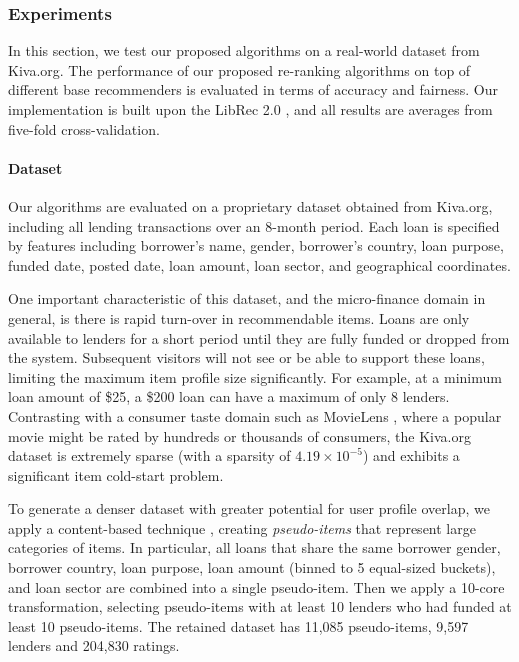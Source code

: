 \subsubsection{\textbf{Experiments}}\label{sect:exp}
\hfill

In this section, we test our proposed algorithms on a real-world dataset from Kiva.org. The performance of our proposed re-ranking algorithms on top of different base recommenders is evaluated in terms of accuracy and fairness. Our implementation is built upon the LibRec 2.0 \cite{guo2015librec}, and all results are averages from five-fold cross-validation.


\paragraph{\textbf{Dataset}}
Our algorithms are evaluated on a proprietary dataset obtained from Kiva.org, including all lending transactions over an 8-month period. Each loan is specified by features including borrower's name, gender, borrower's country, loan purpose, funded date, posted date, loan amount, loan sector, and geographical coordinates.

One important characteristic of this dataset, and the micro-finance domain in general, is there is rapid turn-over in recommendable items. Loans are only available to lenders for a short period until they are fully funded or dropped from the system. Subsequent visitors will not see or be able to support these loans, limiting the maximum item profile size significantly. For example, at a minimum loan amount of \$25, a \$200 loan can have a maximum of only 8 lenders. Contrasting with a consumer taste domain such as MovieLens \cite{movielens}, where a popular movie might be rated by hundreds or thousands of consumers, the Kiva.org dataset is extremely sparse (with a sparsity of $4.19\times 10^{-5}$) and exhibits a significant item cold-start problem.

To generate a denser dataset with greater potential for user profile overlap, we apply a content-based technique \cite{resnick1997recommender}, creating \textit{pseudo-items} that represent large categories of items. In particular, all loans that share the same borrower gender, borrower country, loan purpose, loan amount (binned to 5 equal-sized buckets), and loan sector are combined into a single pseudo-item. Then we apply a 10-core transformation, selecting pseudo-items with at least 10 lenders who had funded at least 10 pseudo-items. The retained dataset has 11,085 pseudo-items, 9,597 lenders and 204,830 ratings.

